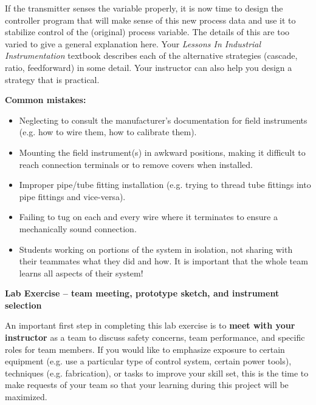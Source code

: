 If the transmitter senses the variable properly, it is now time to design the controller program that will make sense of this new process data and use it to stabilize control of the (original) process variable.  The details of this are too varied to give a general explanation here.  Your {\it Lessons In Industrial Instrumentation} textbook describes each of the alternative strategies (cascade, ratio, feedforward) in some detail.  Your instructor can also help you design a strategy that is practical.

\vskip 10pt

{\bf Common mistakes:}

\begin{itemize}
\item{} Neglecting to consult the manufacturer's documentation for field instruments (e.g. how to wire them, how to calibrate them).
\item{} Mounting the field instrument(s) in awkward positions, making it difficult to reach connection terminals or to remove covers when installed.
\item{} Improper pipe/tube fitting installation (e.g. trying to thread tube fittings into pipe fittings and vice-versa).
\item{} Failing to tug on each and every wire where it terminates to ensure a mechanically sound connection.
\item{} Students working on portions of the system in isolation, not sharing with their teammates what they did and how.  It is important that the whole team learns all aspects of their system!
\end{itemize}






\vfil \eject

\noindent
{\bf Lab Exercise -- team meeting, prototype sketch, and instrument selection}

\vskip 5pt

An important first step in completing this lab exercise is to {\bf meet with your instructor} as a team to discuss safety concerns, team performance, and specific roles for team members.  If you would like to emphasize exposure to certain equipment (e.g. use a particular type of control system, certain power tools), techniques (e.g. fabrication), or tasks to improve your skill set, this is the time to make requests of your team so that your learning during this project will be maximized.

\vskip 10pt


